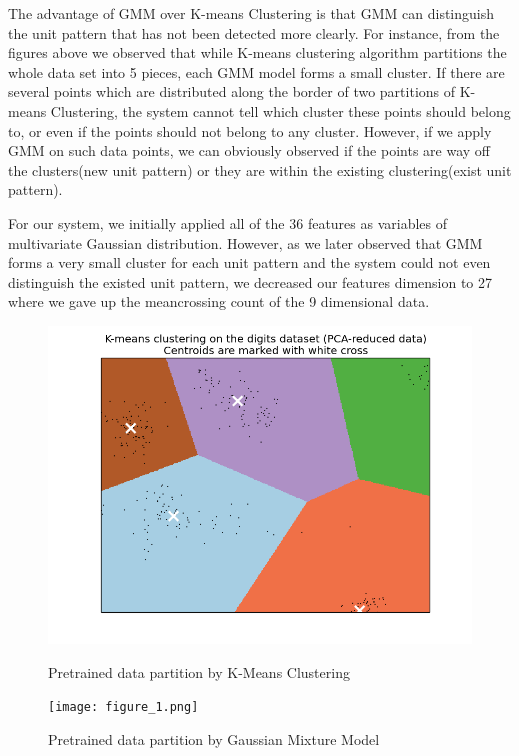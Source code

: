 \documentclass[a4paper, 10pt, conference]{IEEEtran}      %
\begin{document}
The advantage of GMM over K-means Clustering is that GMM can distinguish the unit pattern that has not been detected more clearly. For instance, from the figures above we observed that while K-means clustering algorithm partitions the whole data set into 5 pieces, each GMM model forms a small cluster. If there are several points which are distributed along the border of two partitions of K-means Clustering, the system cannot tell which cluster these points should belong to, or even if the points should not belong to any cluster. However, if we apply GMM on such data points, we can obviously observed if the points are way off the clusters(new unit pattern) or they are within the existing clustering(exist unit pattern).\par
For our system, we initially applied all of the 36 features as variables of multivariate Gaussian distribution. However, as we later observed that GMM forms a very small cluster for each unit pattern and the system could not even distinguish the existed unit pattern, we decreased our features dimension to 27 where we gave up the meancrossing count of the 9 dimensional data. \par
\begin{figure}
\centering
\begin{minipage}{.5\textwidth}
	\centering
	\includegraphics[scale=0.3]{kmeans-5clusters.png}
	\caption{Pretrained data partition by K-Means Clustering}
\end{minipage}
\begin{minipage}{.5\textwidth}
	\centering
	\texttt{[image: figure\_1.png]}
	\caption{Pretrained data partition by Gaussian Mixture Model}
\end{minipage}
\end{figure}
\end{document}
